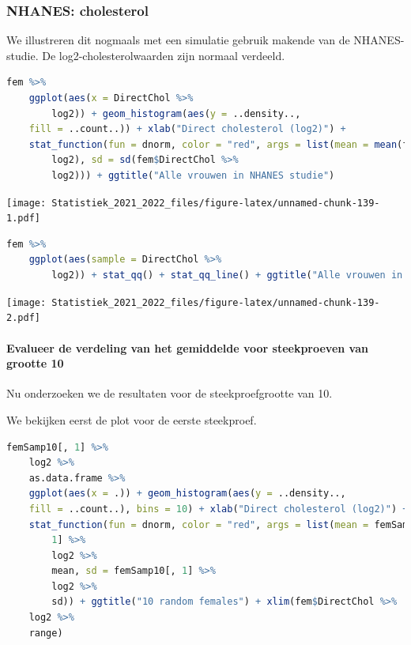 \documentclass[
  12pt,dutch,coursenotes]{book}
\theoremstyle{definition}
\theoremstyle{definition}
\theoremstyle{definition}
\theoremstyle{definition}
\theoremstyle{remark}
\begin{document}
\hypertarget{nhanes-cholesterol}{%
\subsubsection{NHANES: cholesterol}\label{nhanes-cholesterol}}

We illustreren dit nogmaals met een simulatie gebruik makende van de NHANES-studie.
De log2-cholesterolwaarden zijn normaal verdeeld.

\begin{lstlisting}[language=R]
fem %>%
    ggplot(aes(x = DirectChol %>%
        log2)) + geom_histogram(aes(y = ..density..,
    fill = ..count..)) + xlab("Direct cholesterol (log2)") +
    stat_function(fun = dnorm, color = "red", args = list(mean = mean(fem$DirectChol %>%
        log2), sd = sd(fem$DirectChol %>%
        log2))) + ggtitle("Alle vrouwen in NHANES studie")
\end{lstlisting}

\texttt{[image: Statistiek\_2021\_2022\_files/figure-latex/unnamed-chunk-139-1.pdf]}

\begin{lstlisting}[language=R]
fem %>%
    ggplot(aes(sample = DirectChol %>%
        log2)) + stat_qq() + stat_qq_line() + ggtitle("Alle vrouwen in NHANES study")
\end{lstlisting}

\texttt{[image: Statistiek\_2021\_2022\_files/figure-latex/unnamed-chunk-139-2.pdf]}

\hypertarget{evalueer-de-verdeling-van-het-gemiddelde-voor-steekproeven-van-grootte-10}{%
\paragraph{Evalueer de verdeling van het gemiddelde voor steekproeven van grootte 10}\label{evalueer-de-verdeling-van-het-gemiddelde-voor-steekproeven-van-grootte-10}}

Nu onderzoeken we de resultaten voor de steekproefgrootte van 10.

We bekijken eerst de plot voor de eerste steekproef.

\begin{lstlisting}[language=R]
femSamp10[, 1] %>%
    log2 %>%
    as.data.frame %>%
    ggplot(aes(x = .)) + geom_histogram(aes(y = ..density..,
    fill = ..count..), bins = 10) + xlab("Direct cholesterol (log2)") +
    stat_function(fun = dnorm, color = "red", args = list(mean = femSamp10[,
        1] %>%
        log2 %>%
        mean, sd = femSamp10[, 1] %>%
        log2 %>%
        sd)) + ggtitle("10 random females") + xlim(fem$DirectChol %>%
    log2 %>%
    range)
\end{lstlisting}
\end{document}
